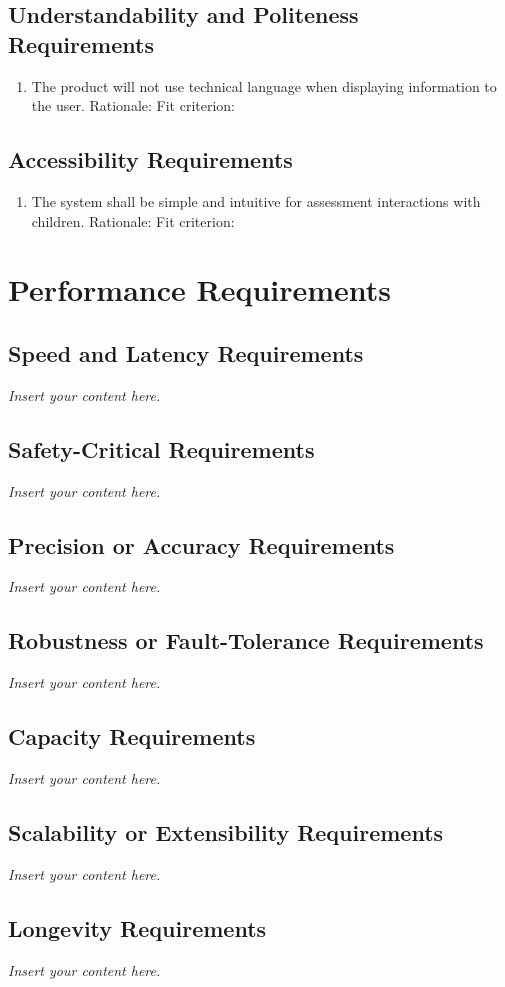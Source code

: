 \documentclass[12pt]{article}
\newcommand{\lips}{\textit{Insert your content here.}}
\begin{document}
\subsection{Understandability and Politeness Requirements}
\begin{enumerate}[{UH-UP}1. ]
  \item The product will not use technical language when displaying information to the user.
  Rationale: 
  Fit criterion: 
\end{enumerate}
\subsection{Accessibility Requirements}
\begin{enumerate}[{UH-A}1. ]
  \item The system shall be simple and intuitive for assessment interactions with children.
  Rationale: 
  Fit criterion: 
\end{enumerate}

\section{Performance Requirements}
\subsection{Speed and Latency Requirements}
\lips
\subsection{Safety-Critical Requirements}
\lips
\subsection{Precision or Accuracy Requirements}
\lips
\subsection{Robustness or Fault-Tolerance Requirements}
\lips
\subsection{Capacity Requirements}
\lips
\subsection{Scalability or Extensibility Requirements}
\lips
\subsection{Longevity Requirements}
\lips
\end{document}
